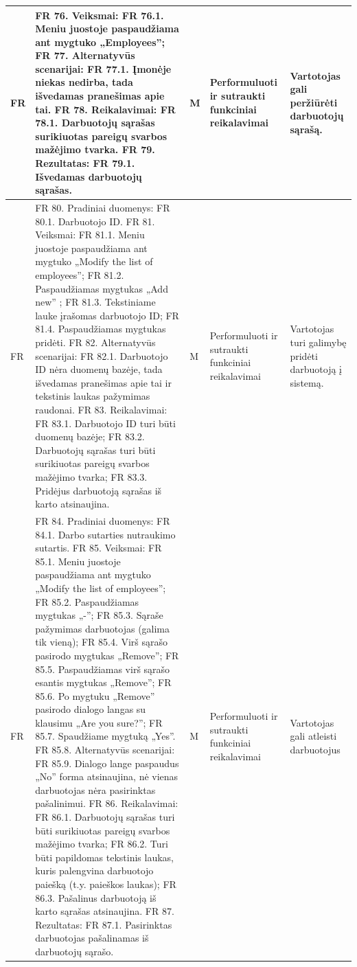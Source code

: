 \documentclass[oneside]{VUMIFPSkursinis}
\begin{document}
\begin{longtable}{ | p{}|p{}|p{}|p{}|p{}| }
FR & FR 76. Veiksmai:
FR 76.1. Meniu juostoje paspaudžiama ant mygtuko „Employees”;
FR 77. Alternatyvūs scenarijai:
FR 77.1. Įmonėje niekas nedirba, tada išvedamas pranešimas apie tai.
FR 78. Reikalavimai:
FR 78.1. Darbuotojų sąrašas surikiuotas pareigų svarbos mažėjimo tvarka.
FR 79. Rezultatas:
FR 79.1. Išvedamas darbuotojų sąrašas. & M & Performuluoti ir sutraukti funkciniai reikalavimai & Vartotojas gali peržiūrėti darbuotojų sąrašą. \\ \hline

FR & FR 80. Pradiniai duomenys:
FR 80.1. Darbuotojo ID.
FR 81. Veiksmai:
FR 81.1. Meniu juostoje paspaudžiama ant mygtuko „Modify the list of employees”;
FR 81.2. Paspaudžiamas mygtukas „Add new” ;
FR 81.3. Tekstiniame lauke įrašomas darbuotojo ID;
FR 81.4. Paspaudžiamas mygtukas pridėti.
FR 82. Alternatyvūs scenarijai:
FR 82.1. Darbuotojo ID nėra duomenų bazėje, tada išvedamas pranešimas apie tai ir tekstinis laukas pažymimas raudonai.
FR 83. Reikalavimai:
FR 83.1. Darbuotojo ID turi būti duomenų bazėje;
FR 83.2. Darbuotojų sąrašas turi būti surikiuotas pareigų svarbos mažėjimo tvarka;
FR 83.3. Pridėjus darbuotoją sąrašas iš karto atsinaujina. & M & Performuluoti ir sutraukti funkciniai reikalavimai & Vartotojas turi galimybę pridėti darbuotoją į sistemą. \\ \hline

FR & FR 84. Pradiniai duomenys:
FR 84.1. Darbo sutarties nutraukimo sutartis.
FR 85. Veiksmai:
FR 85.1. Meniu juostoje paspaudžiama ant mygtuko „Modify the list of employees”;
FR 85.2. Paspaudžiamas mygtukas „-”;
FR 85.3. Sąraše pažymimas darbuotojas (galima tik vieną);
FR 85.4. Virš sąrašo pasirodo mygtukas „Remove”;
FR 85.5. Paspaudžiamas virš sąrašo esantis mygtukas „Remove”;
FR 85.6. Po mygtuku „Remove” pasirodo dialogo langas su klausimu „Are you sure?”;
FR 85.7. Spaudžiame mygtuką „Yes”.
FR 85.8. Alternatyvūs scenarijai:
FR 85.9. Dialogo lange paspaudus „No” forma atsinaujina, nė vienas darbuotojas nėra pasirinktas pašalinimui.
FR 86. Reikalavimai:
FR 86.1. Darbuotojų sąrašas turi būti surikiuotas pareigų svarbos mažėjimo tvarka;
FR 86.2. Turi būti papildomas tekstinis laukas, kuris palengvina darbuotojo paiešką (t.y. paieškos laukas);
FR 86.3. Pašalinus darbuotoją iš karto sąrašas atsinaujina.
FR 87. Rezultatas:
FR 87.1. Pasirinktas darbuotojas pašalinamas iš darbuotojų sąrašo. & M & Performuluoti ir sutraukti funkciniai reikalavimai & Vartotojas gali atleisti darbuotojus \\ \hline


\end{longtable}
\end{document}
